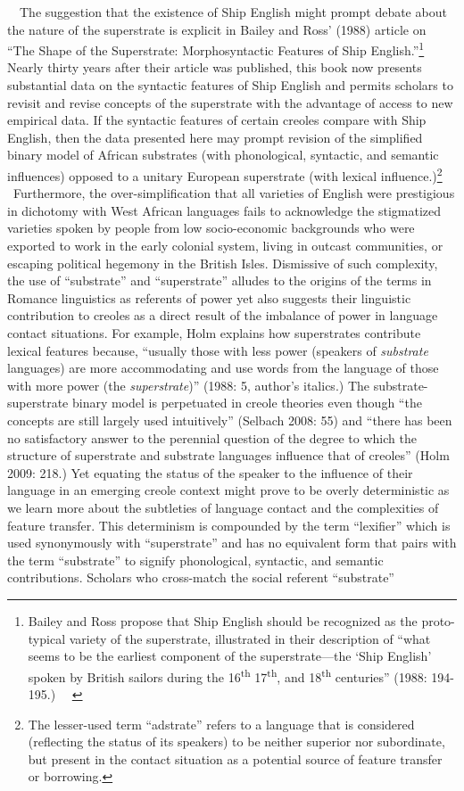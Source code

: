 \documentclass[12pt]{article}
\newenvironment{styleStandard}{\renewcommand\baselinestretch{1.0}\setlength\leftskip{0cm}\setlength\rightskip{0cm plus 1fil}\setlength\parindent{0cm}\setlength\parfillskip{0pt plus 1fil}\setlength\parskip{0in plus 1pt}\writerlistparindent\writerlistleftskip\leavevmode\normalfont\normalsize\writerlistlabel\ignorespaces}{\unskip\vspace{0in plus 1pt}\par}
\newcommand\writerlistleftskip{}
\newcommand\writerlistparindent{}
\newcommand\writerlistlabel{}
\begin{document}
\begin{styleStandard}
\ \ The suggestion that the existence of Ship English might prompt debate about the nature of the superstrate is explicit in Bailey and Ross’ (1988) article on “The Shape of the Superstrate: Morphosyntactic Features of Ship English.”\footnote{ Bailey and Ross propose that Ship English should be recognized as the proto-typical variety of the superstrate, illustrated in their description of “what seems to be the earliest component of the superstrate—the ‘Ship English’ spoken by British sailors during the 16\textsuperscript{th} 17\textsuperscript{th}, and 18\textsuperscript{th} centuries” (1988: 194-195.) \ \ } Nearly thirty years after their article was published, this book now presents substantial data on the syntactic features of Ship English and permits scholars to revisit and revise concepts of the superstrate with the advantage of access to new empirical data. If the syntactic features of certain creoles compare with Ship English, then the data presented here may prompt revision of the simplified binary model of African substrates (with phonological, syntactic, and semantic influences) opposed to a unitary European superstrate (with lexical influence.)\footnote{ The lesser-used term “adstrate” refers to a language that is considered (reflecting the status of its speakers) to be neither superior nor subordinate, but present in the contact situation as a potential source of feature transfer or borrowing.} \ Furthermore, the over-simplification that all varieties of English were prestigious in dichotomy with West African languages fails to acknowledge the stigmatized varieties spoken by people from low socio-economic backgrounds who were exported to work in the early colonial system, living in outcast communities, or escaping political hegemony in the British Isles. Dismissive of such complexity, the use of “substrate” and “superstrate” alludes to the origins of the terms in Romance linguistics as referents of power yet also suggests their linguistic contribution to creoles as a direct result of the imbalance of power in language contact situations. For example, Holm explains how superstrates contribute lexical features because, “usually those with less power (speakers of \textit{substrate} languages) are more accommodating and use words from the language of those with more power (the \textit{superstrate})” (1988: 5, author’s italics.) The substrate-superstrate binary model is perpetuated in creole theories even though “the concepts are still largely used intuitively” (Selbach 2008: 55) and “there has been no satisfactory answer to the perennial question of the degree to which the structure of superstrate and substrate languages influence that of creoles” (Holm 2009: 218.) Yet equating the status of the speaker to the influence of their language in an emerging creole context might prove to be overly deterministic as we learn more about the subtleties of language contact and the complexities of feature transfer. This determinism is compounded by the term “lexifier” which is used synonymously with “superstrate” and has no equivalent form that pairs with the term “substrate” to signify phonological, syntactic, and semantic contributions. Scholars who cross-match the social referent “substrate” 
\end{styleStandard}
\end{document}
